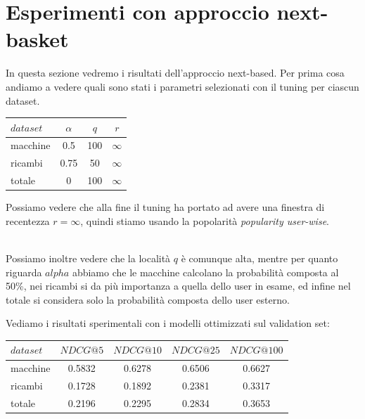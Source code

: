 \section{Esperimenti con approccio next-basket}
In questa sezione vedremo i risultati dell'approccio next-based. Per prima cosa andiamo a vedere quali sono stati i parametri selezionati con il tuning per ciascun dataset.\\

\begin{minipage}[H]{0.45\textwidth}
    \begin{tabular}{|l|ccc|}
        \toprule
        $dataset$ &    $\alpha$ &  $q$ & $r$ \\
        \midrule
        macchine & 0.5 & 100 & $\infty$ \\
        ricambi  &	0.75 & 50 & $\infty$ \\
        totale  & 0 & 100 & $\infty$ \\
    \bottomrule
    \end{tabular}
\end{minipage}
\begin{minipage}[H]{0.55\textwidth}
    Possiamo vedere che alla fine il tuning ha portato ad avere una finestra di recentezza  $r = \infty$, quindi stiamo usando la popolarità \textit{popularity user-wise}. 
\end{minipage}\\

Possiamo inoltre vedere che la località $q$ è comunque alta, mentre per quanto riguarda $alpha$ abbiamo che le macchine calcolano la probabilità composta al 50\%, nei ricambi si da più importanza a quella dello user in esame, ed infine nel totale si considera solo la probabilità composta dello user esterno.

Vediamo i risultati sperimentali con i modelli ottimizzati sul validation set:\\

\begin{tabular}{|l|cccc|}
    \toprule
    $dataset$  &  $NDCG@5$ & $NDCG@10$  & $NDCG@25$ & $NDCG@100$  \\
    \midrule
    macchine & 0.5832 & 0.6278 & 0.6506 & 0.6627 \\
    ricambi & 0.1728 & 0.1892 & 0.2381 & 0.3317 \\
    totale  & 0.2196 & 0.2295 & 0.2834 & 0.3653 \\
\bottomrule
\end{tabular}\\

